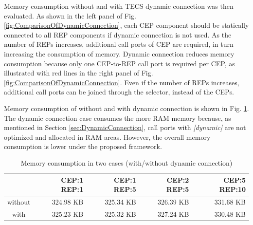 \documentclass[conference]{IEEEtran/IEEEtran}
\begin{document}
Memory consumption without and with TECS dynamic connection was then evaluated.
As shown in the left panel of Fig. \ref{fig:ComparisonOfDynamicConnection}, each CEP component should be statically connected to all REP components if dynamic connection is not used.
As the number of REPs increases, additional call ports of CEP are required, in turn increasing the consumption of memory. 
Dynamic connection reduces memory consumption because only one CEP-to-REP call port is required per CEP, as illustrated with red lines in the right panel of Fig. \ref{fig:ComparisonOfDynamicConnection}.
Even if the number of REPs increases, additional call ports can be joined through the selector, instead of the CEPs.

Memory consumption of without and with dynamic connection is shown in Fig. \ref{fig:EvaluationOfDynamicConnection}.
The dynamic connection case consumes the more RAM memory because, as mentioned in Section \ref{sec:DynamicConnection}, call ports with {\it [dynamic]} are not optimized and allocated in RAM areas.
However, the overall memory consumption is lower under the proposed framework.

\begin{table}[t]
    \centering
    \vspace{-1mm} \caption{Memory consumption in two cases (with/without dynamic connection)}
    \begin{tabular}{c|r|r|r|r}
        \hline\hline
                &  CEP:1 REP:1 & CEP:1 REP:5 & CEP:2 REP:5 & CEP:5 REP:10 \\ \hline
        without &  324.98 KB   & 325.34 KB   & 326.39 KB   & 331.68 KB   \\
        with    &  325.23 KB   & 325.32 KB   & 327.24 KB   & 330.48 KB   \\
        \hline
    \end{tabular}
    \label{fig:EvaluationOfDynamicConnection}
\end{table}
\end{document}
